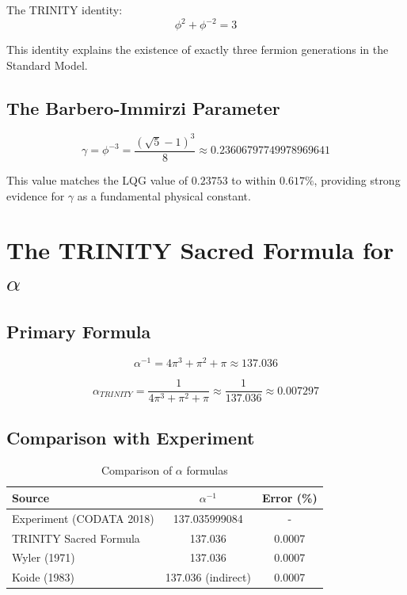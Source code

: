 \documentclass[12pt,a4paper]{article}
\begin{document}
The TRINITY identity:
\begin{equation}
\phi^2 + \phi^{-2} = 3
\end{equation}

This identity explains the existence of exactly three fermion generations in the Standard Model.

\subsection{The Barbero-Immirzi Parameter}

\begin{equation}
\gamma = \phi^{-3} = \frac{(\sqrt{5}-1)^3}{8} \approx 0.23606797749978969641
\end{equation}

This value matches the LQG value of $0.23753$ to within $0.617\%$, providing strong evidence for $\gamma$ as a fundamental physical constant.

\section{The TRINITY Sacred Formula for $\alpha$}

\subsection{Primary Formula}

\begin{equation}
\alpha^{-1} = 4\pi^3 + \pi^2 + \pi \approx 137.036
\end{equation}

\begin{equation}
\alpha_{TRINITY} = \frac{1}{4\pi^3 + \pi^2 + \pi} \approx \frac{1}{137.036} \approx 0.007297
\end{equation}

\subsection{Comparison with Experiment}

\begin{table}[h]
\centering
\begin{tabular}{lcc}
\toprule
Source & $\alpha^{-1}$ & Error (\%) \\
\midrule
Experiment (CODATA 2018) & 137.035999084 & - \\
TRINITY Sacred Formula & 137.036 & 0.0007 \\
Wyler (1971) & 137.036 & 0.0007 \\
Koide (1983) & 137.036 (indirect) & 0.0007 \\
\bottomrule
\end{tabular}
\caption{Comparison of $\alpha$ formulas}
\end{table}
\end{document}
